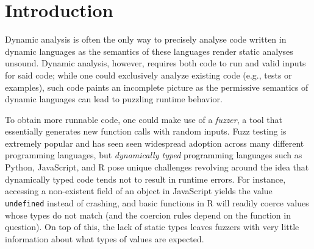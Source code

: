 \documentclass[sigplan,anonymous,review]{acmart}
\begin{document}
\begin{abstract}

\end{abstract}

\maketitle

\section{Introduction}
\label{sec:introduction}

Dynamic analysis is often the only way to precisely analyse code written in dynamic languages as the semantics of these languages render static analyses unsound. 
Dynamic analysis, however, requires both code to run and valid inputs for said code; while one could exclusively analyze existing code (e.g., tests or examples), such code paints an incomplete picture as the permissive semantics of dynamic languages can lead to puzzling runtime behavior.

To obtain more runnable code, one could make use of a \textit{fuzzer}, a tool that essentially generates new function calls with random inputs. 
Fuzz testing is extremely popular and has seen seen widespread adoption across many different programming languages, but \textit{dynamically typed} programming languages such as Python, JavaScript, and R pose unique challenges revolving around the idea that dynamically typed code tends not to result in runtime errors.
For instance, accessing a non-existent field of an object in JavaScript yields the value {\tt undefined} instead of crashing, and basic functions in R will readily coerce values whose types do not match (and the coercion rules depend on the function in question).
On top of this, the lack of static types leaves fuzzers with very little information about what types of values are expected.
\end{document}
